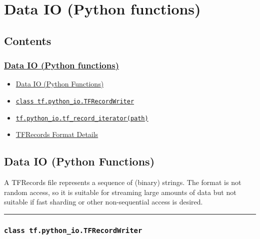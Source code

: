 

\section{Data IO (Python functions) }\label{data-io-python-functions}

\subsection{Contents}\label{contents}

\subsubsection{\texorpdfstring{\protect\hyperlink{AUTOGENERATED-data-io--python-functions-}{Data
IO (Python
functions)}}{Data IO (Python functions)}}\label{data-io-python-functions-1}

\begin{itemize}
\tightlist
\item
  \protect\hyperlink{AUTOGENERATED-data-io--python-functions-}{Data IO
  (Python Functions)}
\item
  \protect\hyperlink{TFRecordWriter}{\texttt{class\ tf.python\_io.TFRecordWriter}}
\item
  \protect\hyperlink{tfux5frecordux5fiterator}{\texttt{tf.python\_io.tf\_record\_iterator(path)}}
\item
  \protect\hyperlink{AUTOGENERATED-tfrecords-format-details}{TFRecords
  Format Details}
\end{itemize}

\subsection{Data IO (Python Functions)
}\label{data-io-python-functions-2}

A TFRecords file represents a sequence of (binary) strings. The format
is not random access, so it is suitable for streaming large amounts of
data but not suitable if fast sharding or other non-sequential access is
desired.

\begin{center}\rule{0.5\linewidth}{\linethickness}\end{center}

\subsubsection{\texorpdfstring{\texttt{class\ tf.python\_io.TFRecordWriter}
}{class tf.python\_io.TFRecordWriter }}\label{class-tf.pythonux5fio.tfrecordwriter}

